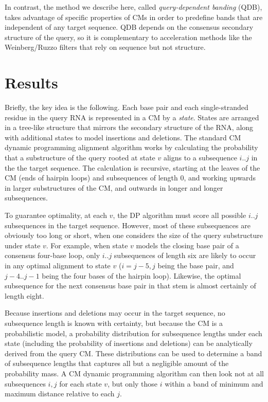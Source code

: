 \documentclass[11pt]{article}
\begin{document}
In contrast, the method we describe here, called \emph{query-dependent
banding} (QDB), takes advantage of specific properties of CMs in order
to predefine bands that are independent of any target sequence.  QDB
depends on the consensus secondary structure of the query, so it is
complementary to acceleration methods like the Weinberg/Ruzzo filters
that rely on sequence but not structure.



\section{Results}

Briefly, the key idea is the following. Each base pair and each
single-stranded residue in the query RNA is represented in a CM by a
\emph{state}. States are arranged in a tree-like structure that
mirrors the secondary structure of the RNA, along with additional
states to model insertions and deletions. The standard CM dynamic
programming alignment algorithm works by calculating the probability
that a substructure of the query rooted at state $v$ aligns to a
subsequence $i..j$ in the the target sequence. The calculation is
recursive, starting at the leaves of the CM (ends of hairpin loops)
and subsequences of length 0, and working upwards in larger
substructures of the CM, and outwards in longer and longer
subsequences.

To guarantee optimality, at each $v$, the DP algorithm must score all
possible $i..j$ subsequences in the target sequence.  However, most of
these subsequences are obviously too long or short, when one considers
the size of the query substructure under state $v$.  For example, when
state $v$ models the closing base pair of a consensus four-base loop,
only $i..j$ subsequences of length six are likely to occur in any
optimal alignment to state $v$ ($i=j-5,j$ being the base pair, and
$j-4..j-1$ being the four bases of the hairpin loop). Likewise, the
optimal subsequence for the next consensus base pair in that stem is
almost certainly of length eight.

Because insertions and deletions may occur in the target sequence, no
subsequence length is known with certainty, but because the CM is a
probabilistic model, a probability distribution for subsequence
lengths under each state (including the probability of insertions and
deletions) can be analytically derived from the query CM.  These
distributions can be used to determine a band of subsequence lengths
that captures all but a negligible amount of the probability mass. A
CM dynamic programming algorithm can then look not at all subsequences
$i,j$ for each state $v$, but only those $i$ within a band of minimum
and maximum distance relative to each $j$.
\end{document}
